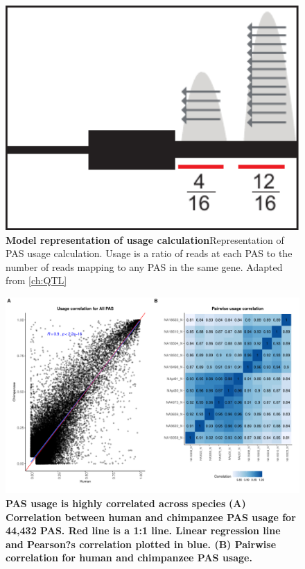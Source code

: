 \begin{figure}[!htb]
\centering
\includegraphics[width=5in]{img/ch03/Fig1-figSup2.pdf}
\caption[Model representation of usage calculation]{\textbf{Model representation of usage calculation}Representation of PAS usage calculation. Usage is a ratio of reads at each PAS to the number of reads mapping to any PAS in the same gene. Adapted from \ref{ch:QTL}}
\label{fig:ch03-UsageCalc}
\end{figure}
\clearpage

\begin{figure}[!htb]
\centering
\includegraphics[width=5in]{img/ch03/Fig1-figSup3.pdf}
\caption[PAS usage is highly correlated across species]{\textbf{PAS usage is highly correlated across species} \bf{(A)} Correlation between human and chimpanzee PAS usage for 44,432 PAS. Red line is a 1:1 line. Linear regression line and Pearson?s correlation plotted in blue. \bf{(B)} Pairwise correlation for human and chimpanzee PAS usage.}
\label{fig:ch03-UsageCorr}
\end{figure}
\clearpage

